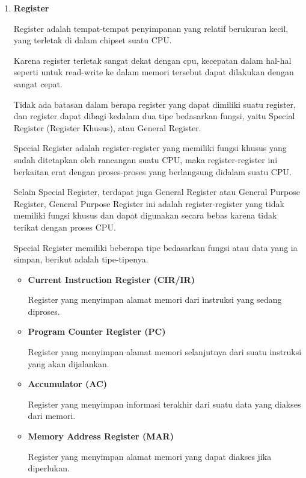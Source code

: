 \begin{enumerate}
  \item \textbf{Register}

    Register adalah tempat-tempat penyimpanan yang relatif berukuran kecil,
    yang terletak di dalam chipset suatu CPU.

    Karena register terletak sangat dekat dengan cpu, kecepatan dalam hal-hal
    seperti untuk read-write ke dalam memori tersebut dapat dilakukan dengan
    sangat cepat.

    Tidak ada batasan dalam berapa register yang dapat dimiliki suatu register,
    dan register dapat dibagi kedalam dua tipe bedasarkan fungsi, yaitu
    Special Register (Register Khusus), atau General Register.

    Special Register adalah register-register yang memiliki fungsi khusus yang
    sudah ditetapkan oleh rancangan suatu CPU, maka register-register ini
    berkaitan erat dengan proses-proses yang berlangsung didalam suatu CPU.

    Selain Special Register, terdapat juga General Register atau General Purpose
    Register, General Purpose Register ini adalah register-register yang tidak
    memiliki fungsi khusus dan dapat digunakan secara bebas karena tidak terikat
    dengan proses CPU.

    Special Register memiliki beberapa tipe bedasarkan fungsi atau data yang
    ia simpan, berikut adalah tipe-tipenya.

    \begin{itemize}

      \item \textbf{Current Instruction Register (CIR/IR)}

        Register yang menyimpan alamat memori dari instruksi yang
        sedang diproses.

      \item \textbf{ Program Counter Register  (PC) }

        Register yang menyimpan alamat memori selanjutnya dari suatu instruksi
        yang akan dijalankan.

      \item \textbf{Accumulator (AC)}

        Register yang menyimpan informasi terakhir dari suatu data yang diakses
        dari memori.

      \item \textbf{Memory Address Register (MAR)}

        Register yang menyimpan alamat memori yang dapat diakses jika diperlukan.


\end{itemize}
\end{enumerate}
